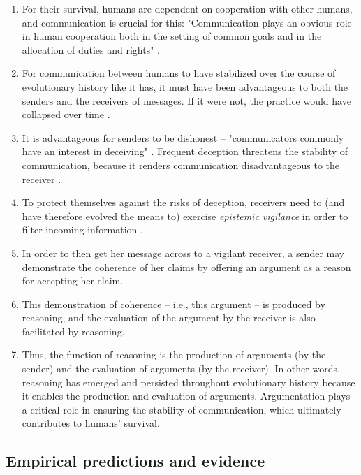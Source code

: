 \begin{enumerate}[label=(\arabic*)]
    \item For their survival, humans are dependent on cooperation with other humans, and communication is crucial for this: "Communication plays an obvious role in human cooperation both in the setting of common goals and in the allocation of duties and rights" \citep[p.~60]{MS11}.
    \item For communication between humans to have stabilized over the course of evolutionary history like it has, it must have been advantageous to both the senders and the receivers of messages. If it were not, the practice would have collapsed over time \citep{Sperber01}.
    \item It is advantageous for senders to be dishonest -- "communicators commonly have an interest in deceiving" \citep[p.~160]{MS09}. Frequent deception threatens the stability of communication, because it renders communication disadvantageous to the receiver \citep{Sperber01}.
    \item To protect themselves against the risks of deception, receivers need to (and have therefore evolved the means to) exercise \emph{epistemic vigilance} in order to filter incoming information \citep{Sperber10}.
    \item In order to then get her message across to a vigilant receiver, a sender may demonstrate the coherence of her claims by offering an argument as a reason for accepting her claim.
    \item This demonstration of coherence -- i.e., this argument -- is produced by reasoning, and the evaluation of the argument by the receiver is also facilitated by reasoning.
    \item Thus, the function of reasoning is the production of arguments (by the sender) and the evaluation of arguments (by the receiver). In other words, reasoning has emerged and persisted throughout evolutionary history because it enables the production and evaluation of arguments. Argumentation plays a critical role in ensuring the stability of communication, which ultimately contributes to humans' survival.
\end{enumerate}

\subsection{Empirical predictions and evidence}

